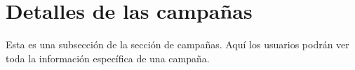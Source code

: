 \section{Detalles de las campañas}
Esta es una subsección de la sección de campañas. Aquí los usuarios podrán ver toda la información específica de una campaña.
    
    